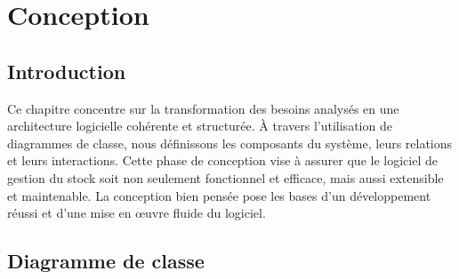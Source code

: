 \documentclass[edit,12pt,a4paper,ChapStyle,oneside,doubleinterligne]{report}
\begin{document}
\chapter{Conception}
\section{Introduction}
Ce chapitre concentre sur la transformation des besoins analysés en une architecture logicielle cohérente et structurée. À travers l'utilisation de diagrammes de classe, nous définissons les composants du système, leurs relations et leurs interactions. Cette phase de conception vise à assurer que le logiciel de gestion du stock soit non seulement fonctionnel et efficace, mais aussi extensible et maintenable. La conception bien pensée pose les bases d'un développement réussi et d'une mise en œuvre fluide du logiciel.
\section{Diagramme de classe}
\end{document}
